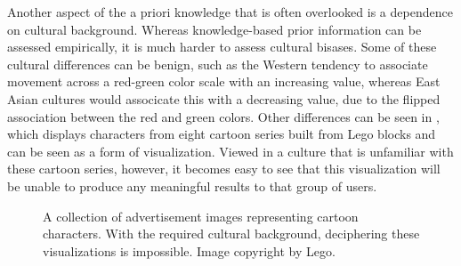 Another aspect of the a priori knowledge that is often overlooked is a dependence on cultural background.  Whereas knowledge-based prior information can be assessed empirically, it is much harder to assess cultural bisases.  Some of these cultural differences can be benign, such as the Western tendency to associate movement across a red-green color scale with an increasing value, whereas East Asian cultures would associcate this with a decreasing value, due to the flipped association between the red and green colors.  Other differences can be seen in , which displays characters from eight cartoon series built from Lego blocks and can be seen as a form of visualization.  Viewed in a culture that is unfamiliar with these cartoon series, however, it becomes easy to see that this visualization will be unable to produce any meaningful results to that group of users.

\begin{figure}
  \centering
  \caption{A collection of advertisement images representing cartoon characters. With the required cultural background, deciphering these visualizations is impossible. Image copyright by Lego.}
  \label{fig:intro:vis:lego}
\end{figure}

